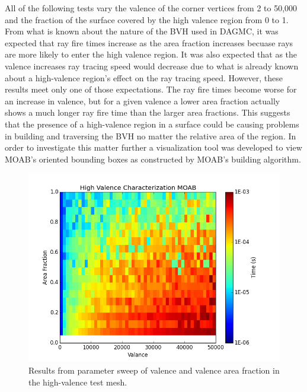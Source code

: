 \documentclass[12pt, a4paper]{article}
\begin{document}
All of the following tests vary the valence of the corner vertices from 2 to 50,000 and the fraction of the surface covered by the high valence region from 0 to 1. From what is known about the nature of the BVH used in DAGMC, it was expected that ray fire times increase as the area fraction increases becuase rays are more likely to enter the high valence region. It was also expected that as the valence increases ray tracing speed would decrease due to what is already known about a high-valence region's effect on the ray tracing speed. However, these results meet only one of those expectations. The ray fire times become worse for an increase in valence, but for a given valence a lower area fraction actually shows a much longer ray fire time than the larger area fractions. This suggests that the presence of a high-valence region in a surface could be causing problems in building and traversing the BVH no matter the relative area of the region. In order to investigate this matter further a visualization tool was developed to view MOAB's oriented bounding boxes as constructed by MOAB's building algorithm.

\begin{figure}[H]
  \centering
    \includegraphics[scale=0.55]{hv_study_MOAB.png}
    \caption{Results from parameter sweep of valence and valence area fraction in the high-valence test mesh.}
    \label{hvsideon}
\end{figure}
\end{document}
